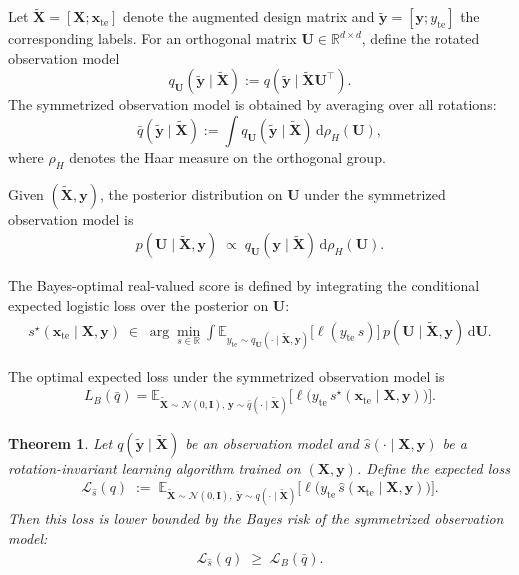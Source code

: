 \documentclass{article}
\theoremstyle{plain}
\newtheorem{theorem}{Theorem}[section]
\theoremstyle{definition}
\theoremstyle{remark}
\begin{document}
{Let $\tilde{\boldsymbol X}=[\boldsymbol X;\boldsymbol x_{\mathrm{te}}]$ denote the
augmented design matrix and $\tilde{\boldsymbol y}=[\boldsymbol y; y_{\mathrm{te}}]$
the corresponding labels.
For an orthogonal matrix $\boldsymbol U\in\mathbb R^{d\times d}$, define the rotated
observation model
\[
q_{\boldsymbol U}(\tilde{\boldsymbol y}\mid\tilde{\boldsymbol X})
:= q(\tilde{\boldsymbol y}\mid \tilde{\boldsymbol X}\boldsymbol U^\top).
\]
The symmetrized observation model is obtained by averaging over all rotations:
\[
\bar q(\tilde{\boldsymbol y}\mid\tilde{\boldsymbol X})
:= \int q_{\boldsymbol U}(\tilde{\boldsymbol y}\mid\tilde{\boldsymbol X})\,\mathrm d\rho_H(\boldsymbol U),
\]
where $\rho_H$ denotes the Haar measure on the orthogonal group.

Given $(\tilde{\boldsymbol X}, \boldsymbol y)$, the posterior distribution on
$\boldsymbol U$ under the symmetrized observation model is
\begin{align}
p(\boldsymbol U \mid \tilde{\boldsymbol X}, \boldsymbol y)
\;\propto\;
q_{\boldsymbol U}(\boldsymbol y \mid \tilde{\boldsymbol X}) \,
\mathrm d\rho_H(\boldsymbol U).
\end{align}

The Bayes-optimal real-valued score is defined by integrating the conditional expected logistic loss over the posterior on
$\boldsymbol U$:
\begin{align}
s^\star(\boldsymbol x_{\mathrm{te}}\mid \boldsymbol X,\boldsymbol y)
\;\in\;
\arg\min_{s\in\mathbb R}
\int
\mathbb E_{y_{\mathrm{te}}\sim q_{\boldsymbol U}(\cdot\mid \tilde{\boldsymbol X},\boldsymbol y)}
\!\big[\ell(y_{\mathrm{te}}\, s)\big]\,
p(\boldsymbol U\mid \tilde{\boldsymbol X},\boldsymbol y)\,
\mathrm d\boldsymbol U .
\end{align}

The optimal expected loss under the symmetrized observation model is
\begin{align}
L_B(\bar q)
=
\mathbb E_{\tilde{\boldsymbol X}\sim \mathcal{N}(0,\mathbf{I}),\,\boldsymbol y\sim \bar q(\cdot\mid\tilde{\boldsymbol X})}
\Big[
\ell\big(y_{\mathrm{te}}\,
s^\star(\boldsymbol x_{\mathrm{te}}\mid \boldsymbol X,\boldsymbol y)\big)
\Big].
\end{align}


\begin{theorem}
 Let $q(\tilde{\boldsymbol y}\mid \tilde{\boldsymbol X})$ be an observation model and
$\hat s(\cdot\mid \boldsymbol X,\boldsymbol y)$ be a rotation-invariant learning algorithm trained on $(\boldsymbol X,\boldsymbol y)$.
Define the expected loss
\begin{align}
\mathcal{L}_{\hat s}(q)
\;:=\;
\mathbb E_{\tilde{\boldsymbol X}\sim  \mathcal{N}(0,\mathbf{I}),\;
\tilde{\boldsymbol y}\sim q(\cdot\mid \tilde{\boldsymbol X})}
\Big[
\ell\!\big(
y_{\mathrm{te}}\,
\hat s(\boldsymbol x_{\mathrm{te}}\mid \boldsymbol X,\boldsymbol y)
\big)
\Big].
\end{align}
Then this loss is lower bounded by the Bayes risk of the symmetrized observation model:
\begin{align}
\mathcal{L}_{\hat{s}}(q)
\;\ge\;
\mathcal{L}_B(\bar q).
\end{align}
\end{theorem}

}
\end{document}
